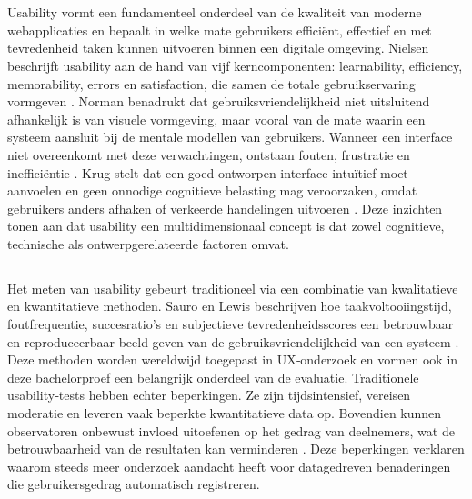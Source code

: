 \chapter{}%
\label{ch:stand-van-zaken}

\section{} 
Usability vormt een fundamenteel onderdeel van de kwaliteit van moderne webapplicaties en bepaalt in welke mate gebruikers efficiënt, effectief en met tevredenheid taken kunnen uitvoeren binnen een digitale omgeving. Nielsen beschrijft usability aan de hand van vijf kerncomponenten: learnability, efficiency, memorability, errors en satisfaction, die samen de totale gebruikservaring vormgeven \autocite{Nielsen1993}. Norman benadrukt dat gebruiksvriendelijkheid niet uitsluitend afhankelijk is van visuele vormgeving, maar vooral van de mate waarin een systeem aansluit bij de mentale modellen van gebruikers. Wanneer een interface niet overeenkomt met deze verwachtingen, ontstaan fouten, frustratie en inefficiëntie \autocite{Norman2013}. Krug stelt dat een goed ontworpen interface intuïtief moet aanvoelen en geen onnodige cognitieve belasting mag veroorzaken, omdat gebruikers anders afhaken of verkeerde handelingen uitvoeren \autocite{Krug2014}. Deze inzichten tonen aan dat usability een multidimensionaal concept is dat zowel cognitieve, technische als ontwerpgerelateerde factoren omvat.

\section{}
Het meten van usability gebeurt traditioneel via een combinatie van kwalitatieve en kwantitatieve methoden. Sauro en Lewis beschrijven hoe taakvoltooiingstijd, foutfrequentie, succesratio’s en subjectieve tevredenheidsscores een betrouwbaar en reproduceerbaar beeld geven van de gebruiksvriendelijkheid van een systeem \autocite{SauroLewis2016}. Deze methoden worden wereldwijd toegepast in UX‑onderzoek en vormen ook in deze bachelorproef een belangrijk onderdeel van de evaluatie. Traditionele usability‑tests hebben echter beperkingen. Ze zijn tijdsintensief, vereisen moderatie en leveren vaak beperkte kwantitatieve data op. Bovendien kunnen observatoren onbewust invloed uitoefenen op het gedrag van deelnemers, wat de betrouwbaarheid van de resultaten kan verminderen \autocite{RubinChisnell2008}. Deze beperkingen verklaren waarom steeds meer onderzoek aandacht heeft voor datagedreven benaderingen die gebruikersgedrag automatisch registreren.

